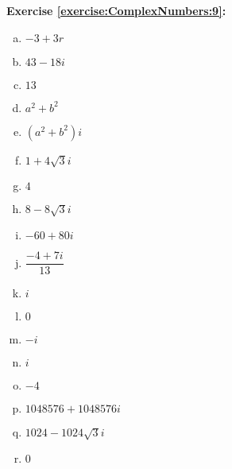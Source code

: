 \noindent\textbf{Exercise \ref{exercise:ComplexNumbers:9}:}
\begin{multicols}{2}
\begin{enumerate}[(a)]
\item
$-3 + 3r$

\item
$43 - 18i$

\item
$13$

\item
$a^2 + b^2$

\item
$(a^2 + b^2)i$

\item
$1 + 4\sqrt{3}i$

\item
$4$

\item
$8 - 8\sqrt{3}i$

\item 
$-60 + 80i$

\item
$\dfrac{-4 + 7i}{13}$

\item
$i$

\item
$0$

\item
$-i$

\item
$i$

\item
$-4$

\item
$1048576 + 1048576i$

\item
$1024 - 1024\sqrt{3}i$

\item
0
\end{enumerate}
\end{multicols}


